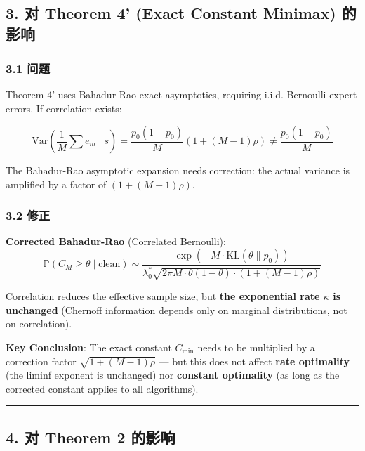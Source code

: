 \documentclass[
  12pt,
]{ctexart}
\begin{document}
\subsection{3. 对 Theorem 4' (Exact Constant Minimax)
的影响}\label{ux5bf9-theorem-4-exact-constant-minimax-ux7684ux5f71ux54cd}

\subsubsection{3.1 问题}\label{ux95eeux9898}

Theorem 4' uses Bahadur-Rao exact asymptotics, requiring i.i.d. Bernoulli
expert errors. If correlation exists:

\[\text{Var}\left(\frac{1}{M}\sum e_m \mid s\right) = \frac{p_0(1-p_0)}{M}(1 + (M-1)\rho) \neq \frac{p_0(1-p_0)}{M}\]

The Bahadur-Rao asymptotic expansion needs correction: the actual variance is amplified by a factor of \((1+(M-1)\rho)\).

\subsubsection{3.2 修正}\label{ux4feeux6b63}

\textbf{Corrected Bahadur-Rao} (Correlated Bernoulli):
\[\mathbb{P}(C_M \geq \theta \mid \text{clean}) \sim \frac{\exp(-M \cdot \text{KL}(\theta \| p_0))}{\lambda_0^* \sqrt{2\pi M \cdot \theta(1-\theta) \cdot (1+(M-1)\rho)}}\]

Correlation reduces the effective sample size, but \textbf{the exponential rate \(\kappa\) is unchanged} (Chernoff
information depends only on marginal distributions, not on correlation).

\textbf{Key Conclusion}: The exact constant \(C_{\min}\) needs to be multiplied by a correction factor \(\sqrt{1+(M-1)\rho}\)
--- but this does not affect \textbf{rate optimality} (the liminf
exponent is unchanged) nor \textbf{constant optimality} (as long as the corrected constant applies to all algorithms).

\begin{center}\rule{0.5\linewidth}{0.5pt}\end{center}

\subsection{4. 对 Theorem 2
的影响}\label{ux5bf9-theorem-2-ux7684ux5f71ux54cd}
\end{document}
